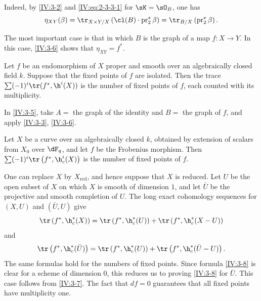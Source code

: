 Indeed, by \ref{IV:3-2} and \eqref{IV:eq:2-3-3-1} for $\sK=\sO_B$, one has
\[
  \eta_{X Y}(\beta) = \tr_{X\times Y/X}\left(\cl(B)\cdot \operatorname{pr}_2^\ast\beta\right) = \tr_{B/X}\left(\operatorname{pr}_2^\ast \beta\right) \text{.}
\]

The most important case is that in which $B$ is the graph of a map
$f:X\to Y$. In this case, \ref{IV:3-6} shows that $\eta_{X Y}=f^\ast$.






\begin{corollary_}\label{IV:3-7}
Let $f$ be an endomorphism of $X$ proper and smooth over an algebraically
closed field $k$. Suppose that the fixed points of $f$ are isolated. Then the
trace $\sum (-1)^i \tr(f^\ast,\h^i(X))$ is the number of fixed points of $f$,
each counted with its multiplicity.
\end{corollary_}

In \ref{IV:3-5}, take $A=$ the graph of the identity and $B=$ the graph of
$f$, and apply \ref{IV:3-3}, \ref{IV:3-6}.






\begin{corollary_}\label{IV:3-8}
Let $X$ be a curve over an algebraically closed $k$, obtained by extension of
scalars from $X_0$ over $\dF_q$, and let $f$ be the Frobenius morphism. Then
$\sum (-1)^i \tr\left(f^\ast,\h_c^i(X)\right)$ is the number of fixed
points of $f$.
\end{corollary_}

One can replace $X$ by $X_\text{red}$, and hence suppose that $X$ is reduced.
Let $U$ be the open subset of $X$ on which $X$ is smooth of dimension $1$,
and let $\bar U$ be the projective and smooth completion of $U$. The long exact
cohomology sequences for $(X,U)$ and $(\bar U,U)$ give
\[
  \tr\left(f^\ast,\h_c^*(X)\right) = \tr\left(f^\ast,\h_c^*(U)\right) + \tr\left(f^\ast,\h_c^*(X-U)\right)
\]
and
\[
  \tr\left(f^\ast,\h_c^*(\bar U)\right) = \tr\left(f^\ast,\h_c^*(U)\right) + \tr\left(f^\ast,\h_c^*(\bar U-U)\right) \text{.}
\]
The same formulas hold for the numbers of fixed points. Since formula
\ref{IV:3-8} is clear for a scheme of dimension $0$, this reduces us to
proving \ref{IV:3-8} for $\bar U$. This case follows from \ref{IV:3-7}. The
fact that $d f=0$ guarantees that all fixed points have multiplicity one.






